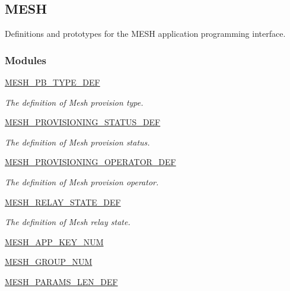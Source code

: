 \hypertarget{group___m_e_s_h}{}\subsection{M\+E\+SH}
\label{group___m_e_s_h}


Definitions and prototypes for the M\+E\+SH application programming interface.  


\subsubsection*{Modules}
\begin{DoxyCompactItemize}
\item 
\hyperlink{group___m_e_s_h___p_b___t_y_p_e___d_e_f}{M\+E\+S\+H\+\_\+\+P\+B\+\_\+\+T\+Y\+P\+E\+\_\+\+D\+EF}
\begin{DoxyCompactList}\small\item\em The definition of Mesh provision type. \end{DoxyCompactList}\item 
\hyperlink{group___m_e_s_h___p_r_o_v_i_s_i_o_n_i_n_g___s_t_a_t_u_s___d_e_f}{M\+E\+S\+H\+\_\+\+P\+R\+O\+V\+I\+S\+I\+O\+N\+I\+N\+G\+\_\+\+S\+T\+A\+T\+U\+S\+\_\+\+D\+EF}
\begin{DoxyCompactList}\small\item\em The definition of Mesh provision status. \end{DoxyCompactList}\item 
\hyperlink{group___m_e_s_h___p_r_o_v_i_s_i_o_n_i_n_g___o_p_e_r_a_t_o_r___d_e_f}{M\+E\+S\+H\+\_\+\+P\+R\+O\+V\+I\+S\+I\+O\+N\+I\+N\+G\+\_\+\+O\+P\+E\+R\+A\+T\+O\+R\+\_\+\+D\+EF}
\begin{DoxyCompactList}\small\item\em The definition of Mesh provision operator. \end{DoxyCompactList}\item 
\hyperlink{group___m_e_s_h___r_e_l_a_y___s_t_a_t_e___d_e_f}{M\+E\+S\+H\+\_\+\+R\+E\+L\+A\+Y\+\_\+\+S\+T\+A\+T\+E\+\_\+\+D\+EF}
\begin{DoxyCompactList}\small\item\em The definition of Mesh relay state. \end{DoxyCompactList}\item 
\hyperlink{group___m_e_s_h___a_p_p___k_e_y___n_u_m}{M\+E\+S\+H\+\_\+\+A\+P\+P\+\_\+\+K\+E\+Y\+\_\+\+N\+UM}
\item 
\hyperlink{group___m_e_s_h___g_r_o_u_p___n_u_m}{M\+E\+S\+H\+\_\+\+G\+R\+O\+U\+P\+\_\+\+N\+UM}
\item 
\hyperlink{group___m_e_s_h___p_a_r_a_m_s___l_e_n___d_e_f}{M\+E\+S\+H\+\_\+\+P\+A\+R\+A\+M\+S\+\_\+\+L\+E\+N\+\_\+\+D\+EF}
\end{DoxyCompactItemize}
